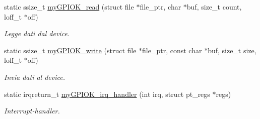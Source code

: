 \begin{DoxyCompactItemize}
static ssize\+\_\+t \hyperlink{group___kernel-_module_ga90ac339df9c02ae5f11a2a7727adc923}{my\+G\+P\+I\+O\+K\+\_\+read} (struct file $\ast$file\+\_\+ptr, char $\ast$buf, size\+\_\+t count, loff\+\_\+t $\ast$off)
\begin{DoxyCompactList}\small\item\em Legge dati dal device. \end{DoxyCompactList}\item 
static ssize\+\_\+t \hyperlink{group___kernel-_module_ga1eea0f6c86e8966ba9b701da57502aad}{my\+G\+P\+I\+O\+K\+\_\+write} (struct file $\ast$file\+\_\+ptr, const char $\ast$buf, size\+\_\+t size, loff\+\_\+t $\ast$off)
\begin{DoxyCompactList}\small\item\em Invia dati al device. \end{DoxyCompactList}\item 
static irqreturn\+\_\+t \hyperlink{group___kernel-_module_ga2fc230a12a97aa63e43b2dc4aec73511}{my\+G\+P\+I\+O\+K\+\_\+irq\+\_\+handler} (int irq, struct pt\+\_\+regs $\ast$regs)
\begin{DoxyCompactList}\small\item\em Interrupt-\/handler. \end{DoxyCompactList}\end{DoxyCompactItemize}
